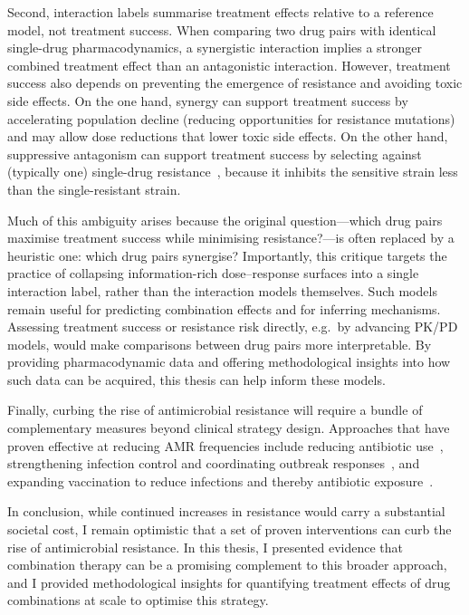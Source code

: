 \documentclass[../main.tex]{subfiles}
\begin{document}
Second, interaction labels summarise treatment effects relative to a reference model, not treatment success.
When comparing two drug pairs with identical single-drug pharmacodynamics, a synergistic interaction implies a stronger combined treatment effect than an antagonistic interaction.
However, treatment success also depends on preventing the emergence of resistance and avoiding toxic side effects.
On the one hand, synergy can support treatment success by accelerating population decline (reducing opportunities for resistance mutations) and may allow dose reductions that lower toxic side effects.
On the other hand, suppressive antagonism can support treatment success by selecting against (typically one) single-drug resistance~\cite{Chait2007}, because it inhibits the sensitive strain less than the single-resistant strain.

Much of this ambiguity arises because the original question---which drug pairs maximise treatment success while minimising resistance?---is often replaced by a heuristic one: which drug pairs synergise?
Importantly, this critique targets the practice of collapsing information-rich dose--response surfaces into a single interaction label, rather than the interaction models themselves.
Such models remain useful for predicting combination effects and for inferring mechanisms.
Assessing treatment success or resistance risk directly, e.g.\ by advancing PK/PD models, would make comparisons between drug pairs more interpretable.
By providing pharmacodynamic data and offering methodological insights into how such data can be acquired, this thesis can help inform these models.

Finally, curbing the rise of antimicrobial resistance will require a bundle of complementary measures beyond clinical strategy design.
Approaches that have proven effective at reducing AMR frequencies include reducing antibiotic use~\cite{Agerso2012, Vellefaux2012}, strengthening infection control and coordinating outbreak responses~\cite{Edgeworth2020, Schwaber2011}, and expanding vaccination to reduce infections and thereby antibiotic exposure~\cite{Kyaw2006}.

In conclusion, while continued increases in resistance would carry a substantial societal cost, I remain optimistic that a set of proven interventions can curb the rise of antimicrobial resistance.
In this thesis, I presented evidence that combination therapy can be a promising complement to this broader approach, and I provided methodological insights for quantifying treatment effects of drug combinations at scale to optimise this strategy.
\end{document}
